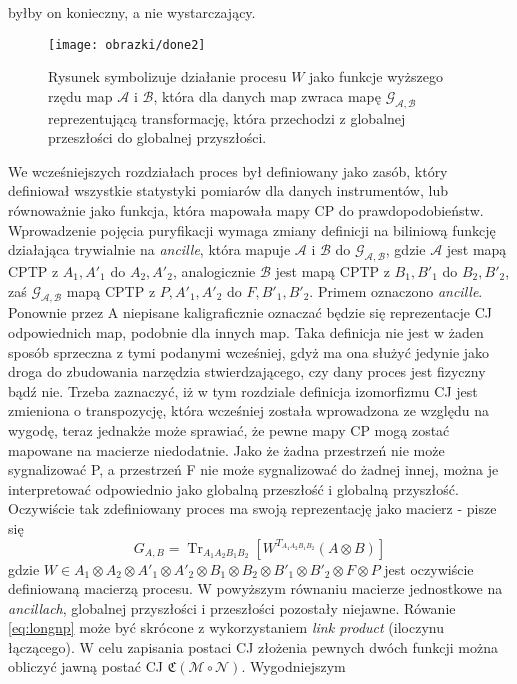 \documentclass[10pt]{article} %
\DeclareMathOperator{\Trs}{Tr}
\newcommand{\MCJ}{\mathfrak{C}}
\begin{document}
byłby on konieczny, a nie wystarczający. 
\begin{figure}[t]
\centering
\texttt{[image: obrazki/done2]}
\caption{
Rysunek symbolizuje działanie procesu $W$ jako funkcje wyższego rzędu map $\mathcal{A}$ i $\mathcal{B}$, która dla danych map zwraca mapę 
$\mathcal{G_{A,B}}$ reprezentującą transformację, która przechodzi z globalnej przeszłości do globalnej przyszłości.
}
\label{higherordermap}
\end{figure}
We wcześniejszych rozdziałach proces był definiowany jako zasób, który definiował wszystkie statystyki pomiarów dla danych instrumentów, lub równoważnie jako funkcja, która mapowała mapy CP do prawdopodobieństw. Wprowadzenie pojęcia puryfikacji wymaga zmiany definicji na biliniową funkcję działająca trywialnie na \textit{ancille}, która mapuje
$\mathcal{A}$ i $\mathcal{B}$ do $\mathcal{G_{A,B}}$, gdzie $\mathcal{A}$ jest mapą CPTP z $A_1, A'_1$ do $A_2, A'_2$, analogicznie $\mathcal{B}$ jest mapą CPTP z
$B_1, B'_1$ do $B_2, B'_2$, zaś $\mathcal{G_{A,B}}$ mapą CPTP z $P, A'_1, A'_2$ do $F, B'_1, B'_2$. Primem oznaczono \textit{ancille}. Ponownie przez A niepisane kaligraficznie oznaczać będzie się reprezentacje CJ odpowiednich map, podobnie dla innych map. Taka definicja nie jest w żaden sposób sprzeczna z tymi podanymi wcześniej, gdyż ma ona służyć jedynie jako droga do zbudowania narzędzia stwierdzającego, czy dany proces jest fizyczny bądź nie. Trzeba zaznaczyć, iż w tym rozdziale definicja izomorfizmu CJ jest zmieniona o transpozycję, która wcześniej została wprowadzona ze względu na wygodę, teraz jednakże może sprawiać, że pewne mapy CP 
mogą zostać mapowane na macierze niedodatnie. Jako że żadna przestrzeń nie może sygnalizować P, a przestrzeń F nie może sygnalizować do żadnej innej,
można je interpretować odpowiednio jako globalną przeszłość i globalną przyszłość. Oczywiście tak zdefiniowany proces ma swoją reprezentację jako macierz - pisze się
\begin{equation}
\label{eq:longnp}
G_{A,B} = \Trs_{A_1A_2B_1B_2} \left[ W^{T_{A_1A_2B_1B_2}} (A\otimes B)\right]
\end{equation}
gdzie $W \in A_1 \otimes A_2 \otimes A'_1 \otimes A'_2 \otimes B_1 \otimes B_2 \otimes B'_1 \otimes B'_2 \otimes F \otimes P$ jest oczywiście definiowaną macierzą procesu. W powyższym równaniu macierze jednostkowe na \textit{ancillach}, globalnej przyszłości i przeszłości pozostały niejawne.
Rówanie \eqref{eq:longnp} może być skrócone z wykorzystaniem \textit{link product} (iloczynu łączącego).
W celu zapisania postaci CJ złożenia pewnych dwóch funkcji można obliczyć jawną postać CJ $\MCJ(\mathcal{M} \circ \mathcal{N})$. Wygodniejszym
\end{document}
